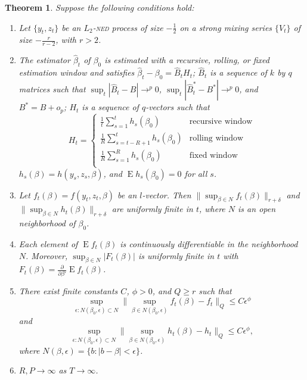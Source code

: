 \documentclass[11pt,fleqn]{article}
\newtheorem{thm}{Theorem}
\theoremstyle{definition}
\DeclareMathOperator{\E}{E}
\newcommand{\dd}[1]{\frac{\partial}{\partial #1}}
\newcommand{\ned}{\textsc{ned}}
\begin{document}
\begin{thm}\label{res:3}
  Suppose the following conditions hold:
  \begin{enumerate}
  \item Let $\{y_t, z_t\}$ be an $L_2$-\textsl{\ned} process of size $-\frac12$ on
    a strong mixing series $\{V_t\}$ of size $-\frac{r}{r-2}$, with $r
    > 2$.
  \item The estimator $\hat{\beta}_t$ of $\beta_0$ is estimated with a
    recursive, rolling, or fixed estimation window and satisfies
    $\hat{\beta}_{t} - \beta_{0} = \hat{B}_{t} H_t$; $\hat{B}_{t}$ is
    a sequence of $k$ by $q$ matrices such that $\sup_t |\hat{B}_t -
    B| \to^p 0$, $\sup_t |\hat{B}_t^{*} - B^{*}| \to^p 0$, and $B^{*}
    = B + o_p$; $H_{t}$ is a sequence of $q$-vectors such that 
    \begin{equation}
      H_{t} = \begin{cases} 
        \tfrac1t \sum_{s=1}^t h_{s}(\beta_{0}) & \text{recursive window} \\
        \tfrac1R \sum_{s=t-R+1}^t h_{s}(\beta_{0}) & \text{rolling window} \\
        \tfrac1R \sum_{s=1}^R h_{s}(\beta_{0}) & \text{fixed window} \\
      \end{cases}
    \end{equation}
    $h_{s}(\beta) = h(y_{s}, z_{s}, \beta)$, and $\E h_{s}(\beta_{0})
    = 0$ for all $s$.
  \item Let $f_{t}(\beta) = f(y_{t}, z_{t}, \beta)$ be an $l$-vector.
    Then $\| \sup_{\beta \in N} f_{t}(\beta) \|_{r+\delta}$ and $\|
    \sup_{\beta \in N} h_{t}(\beta) \|_{r+\delta}$ are uniformly
    finite in $t$, where $N$ is an open neighborhood of $\beta_{0}$.
  \item Each element of $\E f_{t}(\beta)$ is continuously
    differentiable in the neighborhood $N$.  Moreover, $\sup_{\beta
      \in N} | F_{t}(\beta) |$ is uniformly finite in $t$ with
    $F_{t}(\beta) = \dd{\beta'} \E f_{t}(\beta)$.
  \item There exist finite constants $C$, $\phi > 0$, and $Q \geq r$
    such that \[\sup_{\epsilon : N(\beta_{0}, \epsilon) \subset N}\|
    \sup_{\beta \in N(\beta_{0}, \epsilon)} f_{t}(\beta) - f_{t} \|_Q
    \leq C \epsilon^{\phi}\] and \[\sup_{\epsilon : N(\beta_{0},
      \epsilon) \subset N}\| \sup_{\beta \in N(\beta_{0}, \epsilon)}
    h_{t}(\beta) - h_{t} \|_Q \leq C \epsilon^{\phi},\] where
    $N(\beta, \epsilon) = \{b : |b - \beta| < \epsilon\}$.
  \item $R, P \to \infty$ as $T \to \infty$.

\end{enumerate}
\end{thm}
\end{document}
